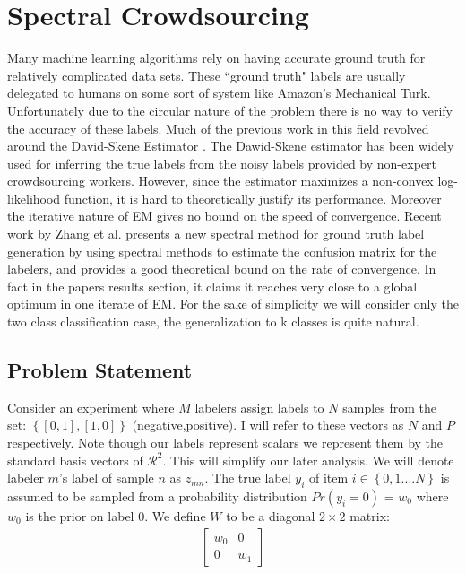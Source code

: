 \documentclass{article}
\begin{document}
\section{Spectral Crowdsourcing} 
    Many machine learning algorithms rely on having accurate ground truth for relatively complicated data sets. These ``ground truth" labels are usually delegated to humans on some sort of system like Amazon's Mechanical Turk. Unfortunately due to the circular nature of the problem there is no way to verify the accuracy of these labels. Much of the previous work in this field revolved around the David-Skene Estimator \cite{dawid1979maximum}. The Dawid-Skene estimator has been widely used for inferring the true labels from the noisy labels provided by non-expert crowdsourcing workers. However, since the estimator maximizes a non-convex log-likelihood function, it is hard to theoretically justify its performance. Moreover the iterative nature of EM gives no bound on the speed of convergence.  Recent work by Zhang et al. \cite{zhang2014spectral} presents a new spectral method for ground truth label generation by using spectral methods to estimate the confusion matrix for the labelers, and provides a good theoretical bound on the rate of convergence. In fact in the papers results section, it claims it reaches very close to a global optimum in one iterate of EM. For the sake of simplicity we will consider only the two class classification case, the generalization to k classes is quite natural.

\subsection{Problem Statement}
Consider an experiment where $M$ labelers assign labels to $N$ samples from the set: $\left\{[0,1],[1,0]\right\}$ (negative,positive). I will refer to these vectors as $N$ and $P$ respectively. Note though our labels represent scalars we represent them by the standard basis vectors of $\mathcal{R}^{2}$. This will simplify our later analysis. We will denote labeler $m$'s label of sample $n$ as $z_{mn}$. The true label $y_{i}$ of item
$i \in \left\{0,1....N\right\} $ is assumed to be sampled from a probability
distribution $Pr(y_{i} = 0)$ = $w_{0}$ where $w_{0}$ is the prior on label 0.  We define $W$ to be a diagonal $2 \times 2$ matrix: 
\begin{align}
\begin{bmatrix}
w_{0} & 0 \\
0     & w_{1}
\end{bmatrix}
\end{align}
\end{document}
